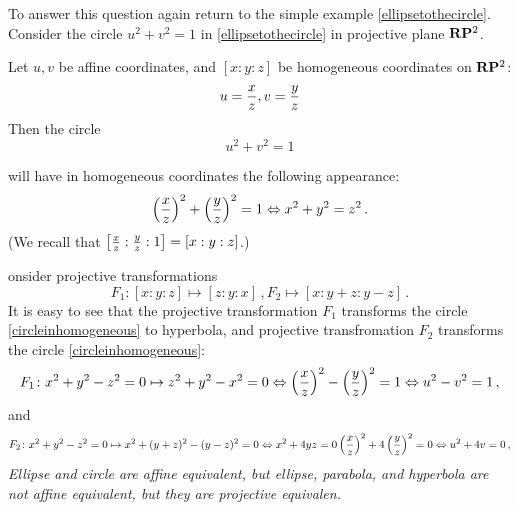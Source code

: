 \documentclass[12pt]{article}
\numberwithin{equation}{section}
\begin{document}
{\footnotesize 
 To answer this question again return to the simple example
  \eqref{ellipsetothecircle}.  Consider the circle $u^2+v^2=1$
in \eqref{ellipsetothecircle} in projective plane ${\bf R}{\bf P}^2$.





Let $u,v$ be affine coordinates, and $[x:y:z]$ be homogeneous coordinates
on ${\bf R}{\bf P}^2$:
            $$
     u={x\over z}, v={y\over z}
            $$
Then the circle 
     \begin{equation*}\label{circleinaffine}
              u^2+v^2=1
                \end{equation*}
 
will have in homogeneous
coordinates the following appearance: 
             \begin{equation}\label{circleinhomogeneous}
\left(x\over z\right)^2+
\left(y\over z\right)^2=1\Leftrightarrow
      x^2+y^2=z^2\,.
                     \end{equation}
(We recall that $\left[{x\over z}:{y\over z}:1\right]=[x:y:z]$.)

onsider projective transformations  
                         \begin{equation}
F_1\colon [x:y:z]\mapsto [z:y:x]\,,   F_2\mapsto [x:y+z:y-z]\,. 
                         \end{equation}
It is easy to see that the projective transformation  $F_1$
transforms the circle \ref{circleinhomogeneous}
to hyperbola, and projective transfromation
$F_2$ transforms the circle \eqref{circleinhomogeneous}:
               $$
   F_1\colon x^2+y^2-z^2=0\mapsto z^2+y^2-x^2=0\Leftrightarrow 
           \left(x\over z\right)^2-
           \left(y\over z\right)^2=1 \Leftrightarrow u^2-v^2=1\,,
               $$    
and               $$
   F_2\colon x^2+y^2-z^2=0\mapsto x^2+(y+z)^2-(y-z)^2=0\Leftrightarrow 
         x^2+4yz=0
           \left(x\over z\right)^2+
           4\left(y\over z\right)^2=0 \Leftrightarrow u^2+4v=0\,,
               $$ 
{\it Ellipse and circle are affine equivalent, but ellipse, parabola,
and hyperbola are not affine equivalent, but they are projective equivalen.}
}
\end{document}

